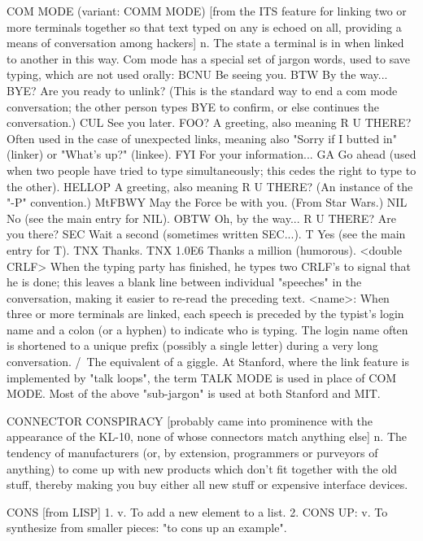 COM MODE (variant: COMM MODE) [from the ITS feature for linking two or
   more terminals together so that text typed on any is echoed on all,
   providing a means of conversation among hackers] n. The state a
   terminal is in when linked to another in this way.  Com mode has a
   special set of jargon words, used to save typing, which are not
   used orally:
	BCNU	Be seeing you.
	BTW	By the way...
	BYE?	Are you ready to unlink?  (This is the standard way to
		end a com mode conversation; the other person types
		BYE to confirm, or else continues the conversation.)
	CUL	See you later.
	FOO?	A greeting, also meaning R U THERE?  Often used in the
		case of unexpected links, meaning also "Sorry if I
		butted in" (linker) or "What's up?" (linkee).
	FYI	For your information...
	GA	Go ahead (used when two people have tried to type
		simultaneously; this cedes the right to type to
		the other).
	HELLOP	A greeting, also meaning R U THERE?  (An instance
		of the "-P" convention.)
	MtFBWY	May the Force be with you.  (From Star Wars.)
	NIL	No (see the main entry for NIL).
	OBTW	Oh, by the way...
	R U THERE?	Are you there?
	SEC	Wait a second (sometimes written SEC...).
	T	Yes (see the main entry for T).
	TNX	Thanks.
	TNX 1.0E6	Thanks a million (humorous).
	<double CRLF>  When the typing party has finished, he types
		two CRLF's to signal that he is done; this leaves a
		blank line between individual "speeches" in the
		conversation, making it easier to re-read the
		preceding text.
	<name>: When three or more terminals are linked, each speech
		is preceded by the typist's login name and a colon (or
		a hyphen) to indicate who is typing.  The login name
		often is shortened to a unique prefix (possibly a
		single letter) during a very long conversation.
	/\/\/\	The equivalent of a giggle.
   At Stanford, where the link feature is implemented by "talk loops",
   the term TALK MODE is used in place of COM MODE.  Most of the above
   "sub-jargon" is used at both Stanford and MIT.

CONNECTOR CONSPIRACY [probably came into prominence with the
   appearance of the KL-10, none of whose connectors match anything
   else] n. The tendency of manufacturers (or, by extension,
   programmers or purveyors of anything) to come up with new products
   which don't fit together with the old stuff, thereby making you buy
   either all new stuff or expensive interface devices.

CONS [from LISP] 1. v. To add a new element to a list.	2. CONS UP:
   v. To synthesize from smaller pieces: "to cons up an example".

